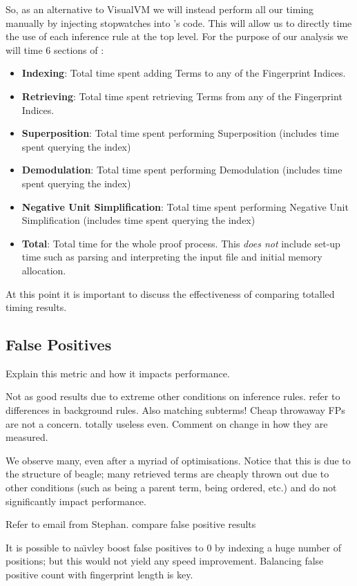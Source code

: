 So, as an alternative to VisualVM we will instead perform all our timing manually
by injecting stopwatches into \beagle's code. This will allow us to directly
time the use of each inference rule at the top level. For the purpose of our analysis
we will time 6 sections of \beagle:
\begin{itemize}
\item \textbf{Indexing}: Total time spent adding Terms to any of the Fingerprint Indices.
\item \textbf{Retrieving}: Total time spent retrieving Terms from any of the Fingerprint Indices.
\item \textbf{Superposition}: Total time spent performing Superposition (includes time spent
querying the index)
\item \textbf{Demodulation}: Total time spent performing Demodulation (includes time spent
querying the index)
\item \textbf{Negative Unit Simplification}: Total time spent performing Negative Unit Simplification (includes time spent
querying the index)
\item \textbf{Total}: Total time for the whole proof process. This \emph{does not} include
set-up time such as parsing and interpreting the input file and initial memory allocation.
\end{itemize}
At this point it is important to discuss the effectiveness of comparing totalled timing
results. 

\subsection{False Positives}
Explain this metric and how it impacts performance.

Not as good results due to extreme other conditions on inference rules.
refer to differences in background rules. Also matching subterms!
Cheap throwaway FPs are not a concern.
totally useless even. Comment on change in how they are measured.

We observe many, even after a myriad of optimisations. Notice
that this is due to the structure of beagle; many retrieved terms
are cheaply thrown out due to other conditions (such as being a parent
term, being ordered, etc.) and do not significantly impact performance.

Refer to email from Stephan. compare false positive results

It is possible to na\"{\i}vley boost false positives to 0 by indexing a
huge number of positions; but this would not yield any speed improvement. Balancing false positive count with fingerprint
length is key.

